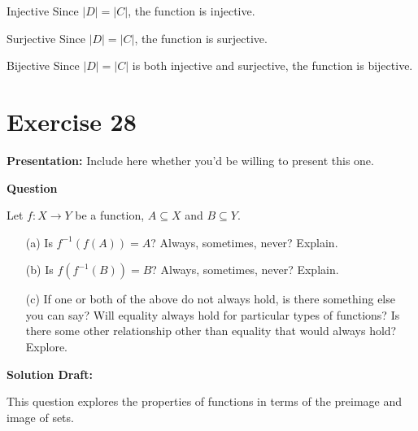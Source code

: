 \documentclass{article}
\begin{document}
Injective
Since $|D| = |C|$, the function is injective.

Surjective
Since $|D| = |C|$, the function is surjective.

Bijective
Since $|D| = |C|$ is both injective and surjective, the function is bijective.


\section*{Exercise 28}  

\noindent\textbf{Presentation:} Include here whether you'd be willing to present this one. 

\vspace{0.5cm} %

\noindent\textbf{Question}

Let \( f : X \to Y \) be a function, \( A \subseteq X \) and \( B \subseteq Y \).

\begin{enumerate}
    \item[(a)] Is \( f^{-1}(f(A)) = A \)? Always, sometimes, never? Explain.
    \item[(b)] Is \( f(f^{-1}(B)) = B \)? Always, sometimes, never? Explain.
    \item[(c)] If one or both of the above do not always hold, is there something else you can say? Will equality always hold for particular types of functions? Is there some other relationship other than equality that would always hold? Explore.
\end{enumerate}


\noindent\textbf{Solution Draft:} 

This question explores the properties of functions in terms of the preimage and image of sets.
\end{document}

